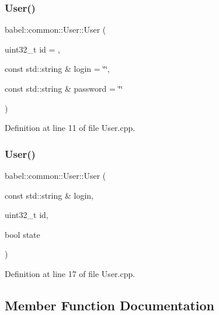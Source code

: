\subsubsection{\texorpdfstring{User()}{User()}\hspace{0.1cm}{\footnotesize\ttfamily [1/2]}}
{\footnotesize\ttfamily babel\+::common\+::\+User\+::\+User (\begin{DoxyParamCaption}\item[{uint32\+\_\+t}]{id = {},  }\item[{const std\+::string \&}]{login = {\ttfamily \char`\"{}\char`\"{}},  }\item[{const std\+::string \&}]{password = {\ttfamily \char`\"{}\char`\"{}} }\end{DoxyParamCaption})\hspace{0.3cm}{\ttfamily [explicit]}}



Definition at line 11 of file User.\+cpp.

\mbox{\label{classbabel_1_1common_1_1_user_a12d30f9811561f98d1039d42da0f4c5d}} 
\subsubsection{\texorpdfstring{User()}{User()}\hspace{0.1cm}{\footnotesize\ttfamily [2/2]}}
{\footnotesize\ttfamily babel\+::common\+::\+User\+::\+User (\begin{DoxyParamCaption}\item[{const std\+::string \&}]{login,  }\item[{uint32\+\_\+t}]{id,  }\item[{bool}]{state }\end{DoxyParamCaption})}



Definition at line 17 of file User.\+cpp.



\subsection{Member Function Documentation}
\mbox{\label{classbabel_1_1common_1_1_user_accfb669d54137d82757a31928053c2c8}} 
